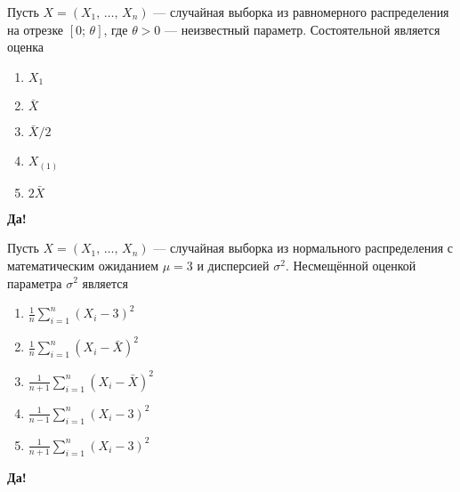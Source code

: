 \documentclass[t]{beamer}
\begin{document}
 \begin{frame} \label{29-Yes} 
\begin{block}{29} 

  Пусть $X = (X_1, \, \ldots, \, X_n)$ — случайная выборка из равномерного распределения на отрезке $[0; \, \theta]$, где $\theta > 0$ — неизвестный параметр.
  Состоятельной является оценка


 \end{block} 
\begin{enumerate} 
\item[] \hyperlink{29-No}{\beamergotobutton{} $X_1$}
\item[] \hyperlink{29-No}{\beamergotobutton{} $\bar{X}$}
\item[] \hyperlink{29-No}{\beamergotobutton{} $\bar{X} / 2$}
\item[] \hyperlink{29-No}{\beamergotobutton{} $X_{(1)}$}
\item[] \hyperlink{29-Yes}{\beamergotobutton{} $2 \bar{X}$}
\end{enumerate} 

 \textbf{Да!} 
 \hyperlink{30}{}\end{frame} 


 \begin{frame} \label{30-Yes} 
\begin{block}{30} 

  Пусть $X = (X_1, \, \ldots, \, X_n)$ — случайная выборка из нормального распределения с математическим ожиданием $\mu = 3$ и дисперсией $\sigma^2$. Несмещённой оценкой параметра $\sigma^2$ является


 \end{block} 
\begin{enumerate} 
\item[] \hyperlink{30-Yes}{\beamergotobutton{} $\frac{1}{n} \sum_{i=1}^{n}(X_i - 3)^2$}
\item[] \hyperlink{30-No}{\beamergotobutton{} $\frac{1}{n} \sum_{i=1}^{n}(X_i - \bar{X})^2$}
\item[] \hyperlink{30-No}{\beamergotobutton{} $\frac{1}{n+1} \sum_{i=1}^{n}(X_i - \bar{X})^2$}
\item[] \hyperlink{30-No}{\beamergotobutton{} $\frac{1}{n-1} \sum_{i=1}^{n}(X_i - 3)^2$}
\item[] \hyperlink{30-No}{\beamergotobutton{} $\frac{1}{n+1} \sum_{i=1}^{n}(X_i - 3)^2$}
\end{enumerate} 

 \textbf{Да!} 
 \hyperlink{31}{}\end{frame} 
\end{document}
